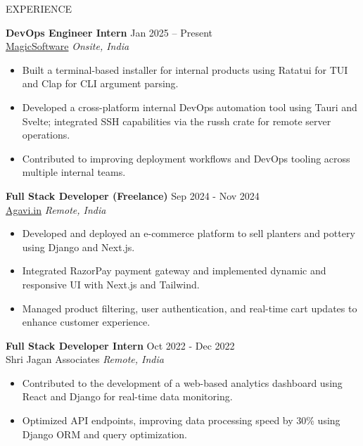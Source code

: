 \documentclass{style}
\begin{document}
\begin{rSection}{EXPERIENCE}

\textbf{DevOps Engineer Intern} \hfill Jan 2025 -- Present\\
\href{https://www.magicsoftware.com}{MagicSoftware} \hfill \textit{Onsite, India}
\begin{itemize}
    \itemsep -3pt {}
    \item Built a terminal-based installer for internal products using Ratatui for TUI and Clap for CLI argument parsing.
    \item Developed a cross-platform internal DevOps automation tool using Tauri and Svelte; integrated SSH capabilities via the russh crate for remote server operations.
    \item Contributed to improving deployment workflows and DevOps tooling across multiple internal teams.
\end{itemize} 

\textbf{Full Stack Developer (Freelance)} \hfill Sep 2024 - Nov 2024\\
\href{https://agavi.in}{Agavi.in} \hfill \textit{Remote, India}
 \begin{itemize}
    \itemsep -3pt {} 
     \item Developed and deployed an e-commerce platform to sell planters and pottery using Django and Next.js.
     \item Integrated RazorPay payment gateway and implemented dynamic and responsive UI with Next.js and Tailwind.
     \item Managed product filtering, user authentication, and real-time cart updates to enhance customer experience.
 \end{itemize}
 
\textbf{Full Stack Developer Intern} \hfill Oct 2022 - Dec 2022\\
Shri Jagan Associates \hfill \textit{Remote, India}
 \begin{itemize}
    \itemsep -3pt {} 
     \item Contributed to the development of a web-based analytics dashboard using React and Django for real-time data monitoring.
     \item Optimized API endpoints, improving data processing speed by 30\% using Django ORM and query optimization.
 \end{itemize}
\end{rSection} 

\end{document}
